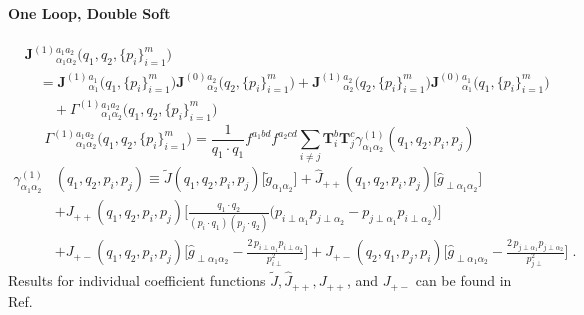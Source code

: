 \documentclass[a4paper,11pt]{article}
\begin{document}
\paragraph{One Loop, Double Soft}
\begin{align}
&\mathbf{J}^{(1)}{}^{a_1 a_2}_{\alpha_1 \alpha_2}\big( q_1, q_2,\{ p_i \}_{i=1}^m \big) \\
& \quad = \mathbf{J}^{(1)}{}^{a_1}_{ \alpha_1}\big( q_1,\{ p_i \}_{i=1}^m \big) \mathbf{J}^{(0)}{}^{a_2}_{ \alpha_2}\big( q_2,\{ p_i \}_{i=1}^m \big) + \mathbf{J}^{(1)}{}^{a_2}_{\alpha_2}\big( q_2,\{ p_i \}_{i=1}^m \big) \mathbf{J}^{(0)}{}^{a_1}_{\alpha_1}\big( q_1,\{ p_i \}_{i=1}^m \big)  \\
& \qquad + \Gamma^{(1)}{}^{a_1 a_2}_{\alpha_1 \alpha_2}\big( q_1, q_2,\{ p_i \}_{i=1}^m \big)
\end{align}
%
\begin{equation}
\Gamma^{(1)}{}^{a_1 a_2}_{\alpha_1 \alpha_2}\big( q_1, q_2,\{ p_i \}_{i=1}^m \big) = \frac{1}{q_1 \cdot q_1} f^{a_1 b d} f^{a_2 c d} \sum_{i \neq j} \mathbf{T}_i^b \mathbf{T}_j^c \gamma^{(1)}_{\alpha_1 \alpha_2} (q_1, q_2, p_i, p_j)
\end{equation}
%
\begin{equation}
\begin{split}
\gamma^{(1)}_{\alpha_1 \alpha_2}& (q_1, q_2, p_i, p_j) \equiv \tilde{J}(q_1, q_2, p_i, p_j) \big[ \tilde{g}_{\alpha_1 \alpha_2} \big] + \hat{J}_{++} (q_1, q_2, p_i, p_j) \big[ \hat{g}_{\perp\alpha_1 \alpha_2} \big] \\[.2cm]
 &+J_{++}(q_1, q_2, p_i, p_j) \bigg[  \frac{q_1 \cdot q_2}{(p_i \cdot q_1) (p_j \cdot q_2)} \big( p_{i\perp\alpha_1} p_{j\perp\alpha_2} - p_{j\perp\alpha_1} p_{i\perp\alpha_2} \big) \bigg] \\[.2cm]
 &+J_{+-}(q_1, q_2, p_i, p_j) \bigg[ \hat{g}_{\perp \alpha_1 \alpha_2} - \frac{2 \, p_{i\perp\alpha_1} p_{i\perp\alpha_2}}{p_{i\perp}^2} \bigg] + J_{+-}(q_2, q_1, p_j, p_i) \bigg[ \hat{g}_{\perp \alpha_1 \alpha_2} - \frac{2 \, p_{j\perp\alpha_1} p_{j\perp\alpha_2}}{p_{j\perp}^2} \bigg] \; .
\end{split}
\end{equation}
%
Results for individual coefficient functions $\tilde{J}, \hat{J}_{++}, J_{++}$, and $J_{+-}$ can be found in Ref.~\cite{Czakon:2022dwk}
%
\end{document}
